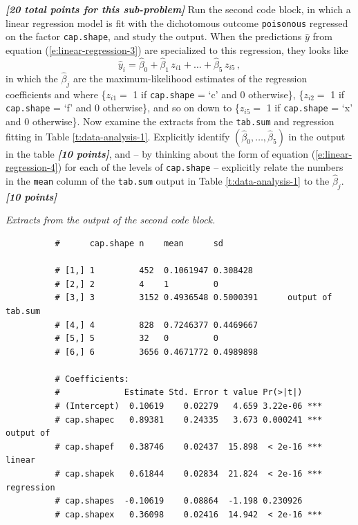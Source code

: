 \documentclass[12pt]{article}
\newcommand{\bi}[1]{\textbf{\textit{#1}}}
\begin{document}
\begin{itemize}
\bi{[20 total points for this sub-problem]} Run the second code block, in which a linear regression model is fit with the dichotomous outcome \texttt{poisonous} regressed on the factor \texttt{cap.shape}, and study the output. When the predictions $\hat{ y }$ from equation (\ref{e:linear-regression-3}) are specialized to this regression, they looks like
\begin{equation} \label{e:linear-regression-4}
\hat{ y }_i = \hat{ \beta }_0 + \hat{ \beta }_1 \, z_{ i1 } + \dots + \hat{ \beta }_5 \, z_{ i5 } \, ,
\end{equation} 
in which the $\hat{ \beta }_j$ are the maximum-likelihood estimates of the regression coefficients and where \{$z_{ i1 } =$ 1 if \texttt{cap.shape} = `c' and 0 otherwise\}, \{$z_{ i2 } =$ 1 if \texttt{cap.shape} = `f' and 0 otherwise\}, and so on down to \{$z_{ i5 } =$ 1 if \texttt{cap.shape} = `x' and 0 otherwise\}. Now examine the extracts from the \texttt{tab.sum} and regression fitting in Table \ref{t:data-analysis-1}. Explicitly identify $( \hat{ \beta }_0, \dots, \hat{ \beta }_5 )$ in the output in the table \bi{[10 points]}, and -- by thinking about the form of equation (\ref{e:linear-regression-4}) for each of the levels of \texttt{cap.shape} -- explicitly relate the numbers in the \texttt{mean} column of the \texttt{tab.sum} output in Table \ref{t:data-analysis-1} to the $\hat{ \beta }_j$. \bi{[10 points]}

\begin{table}[t!]

\centering

\caption{\textit{Extracts from the output of the second code block.}}

\begin{verbatim}
          #      cap.shape n    mean      sd       

          # [1,] 1         452  0.1061947 0.308428 
          # [2,] 2         4    1         0        
          # [3,] 3         3152 0.4936548 0.5000391      output of tab.sum
          # [4,] 4         828  0.7246377 0.4469667
          # [5,] 5         32   0         0        
          # [6,] 6         3656 0.4671772 0.4989898

          # Coefficients:
          #             Estimate Std. Error t value Pr(>|t|)    
          # (Intercept)  0.10619    0.02279   4.659 3.22e-06 ***
          # cap.shapec   0.89381    0.24335   3.673 0.000241 ***   output of
          # cap.shapef   0.38746    0.02437  15.898  < 2e-16 ***   linear
          # cap.shapek   0.61844    0.02834  21.824  < 2e-16 ***   regression
          # cap.shapes  -0.10619    0.08864  -1.198 0.230926    
          # cap.shapex   0.36098    0.02416  14.942  < 2e-16 ***
\end{verbatim}


\end{table}
\end{itemize}
\end{document}
